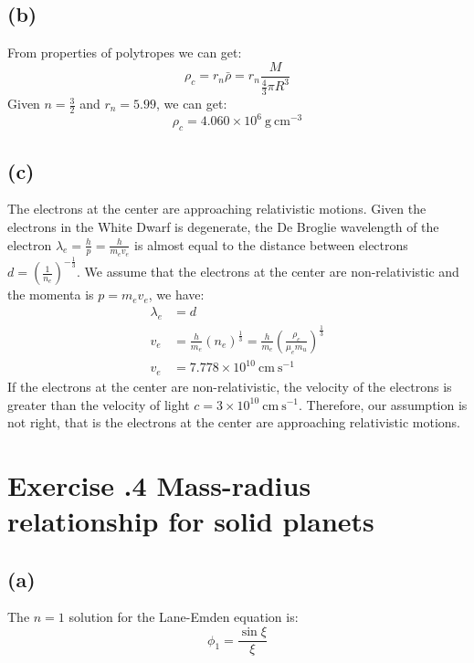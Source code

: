 \documentclass[a4paper,12pt]{article}
\newcommand{\cm}{\mathrm{cm}}
\newcommand{\s}{\mathrm{s}}
\newcommand{\g}{\mathrm{g}}
\begin{document}
\subsection*{(b)}
From properties of polytropes we can get:
\begin{equation*}
    \rho_c = r_n \bar{\rho} = r_n \frac{M}{\frac{4}{3} \pi R^3}
\end{equation*}
Given $n = \frac{3}{2}$ and $r_n = 5.99$, we can get:
\begin{equation*}
    \rho_c = 4.060\times 10^6 \ \g \ \cm^{-3}
\end{equation*}

\subsection*{(c)}
The electrons at the center are approaching relativistic motions. 
Given the electrons in the White Dwarf is degenerate, 
the De Broglie wavelength of the electron $\lambda_e = \frac{h}{p} = \frac{h}{m_e v_e}$
is almost equal to the distance between electrons $d = (\frac{1}{n_e})^{-\frac{1}{3}}$. 
We assume that the electrons at the center are non-relativistic and the momenta is 
$p = m_e v_e$, we have:
\begin{align*}
    \lambda_e &= d \\
    v_e &= \frac{h}{m_e} (n_e)^{\frac{1}{3}} = \frac{h}{m_e} (\frac{\rho_c}{\mu_e m_u})^{\frac{1}{3}} \\
    v_e &= 7.778\times 10^{10} \ \cm \ \s^{-1}
\end{align*}
If the electrons at the center are non-relativistic, the velocity of the electrons is greater than 
the velocity of light $c=3\times 10^{10}\ \cm \ \s^{-1} $.
Therefore, our assumption is not right, that is the electrons at the center are approaching relativistic motions.

\section*{\textbf{Exercise \uppercase\expandafter{}.4 Mass-radius relationship for solid planets}}
\subsection*{(a)}
The $n=1$ solution for the Lane-Emden equation is:
\begin{equation*}
    \phi_1 = \frac{\sin \xi}{\xi}
\end{equation*}
\end{document}
